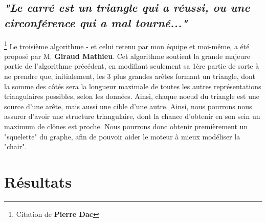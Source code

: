 \documentclass[12pt]{report}
\begin{document}
\begin{spacing}{1.2}
\subsection{\textit{"Le carré est un triangle qui a réussi, ou une circonférence qui a mal tourné..."}}\footnote{Citation de \textbf{Pierre Dac}}
Le troisième algorithme - et celui retenu par mon équipe et moi-même, a été proposé par M. \textbf{Giraud Mathieu}.
\newline
Cet algorithme soutient la grande majeure partie de l'algorithme précédent, en modifiant seulement sa 1ère partie de sorte à ne prendre que, initialement, les 3 plus grandes arêtes formant un triangle, dont la somme des côtés sera la longueur maximale de toutes les autres représentations triangulaires possibles, selon les données. Ainsi, chaque noeud du triangle est une source d'une arête, mais aussi une cible d'une autre.
\newline
Ainsi, nous pourrons nous assurer d'avoir une structure triangulaire, dont la chance d'obtenir en son sein un maximum de clônes est proche.
\newline
Nous pourrons donc obtenir premièrement un "squelette" du graphe, afin de pouvoir aider le moteur à mieux modéliser la "chair".

\section{Résultats}


\end{spacing}
\end{document}
